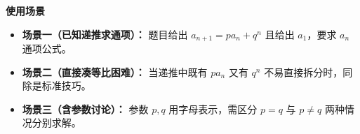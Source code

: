 \begin{explanationbox}
	\medskip
	\textbf{\textcolor{CExplanation}{使用场景}}
	\begin{itemize}[leftmargin=*, itemsep=0.5em, topsep=0.4em]
		\item \textbf{场景一（已知递推求通项）：} 题目给出 $a_{n+1}=p a_n+q^n$ 且给出 $a_1$，要求 $a_n$ 通项公式。
		\item \textbf{场景二（直接凑等比困难）：} 当递推中既有 $p a_n$ 又有 $q^n$ 不易直接拆分时，同除是标准技巧。
		\item \textbf{场景三（含参数讨论）：} 参数 $p,q$ 用字母表示，需区分 $p=q$ 与 $p\neq q$ 两种情况分别求解。
	\end{itemize}

\end{explanationbox}

